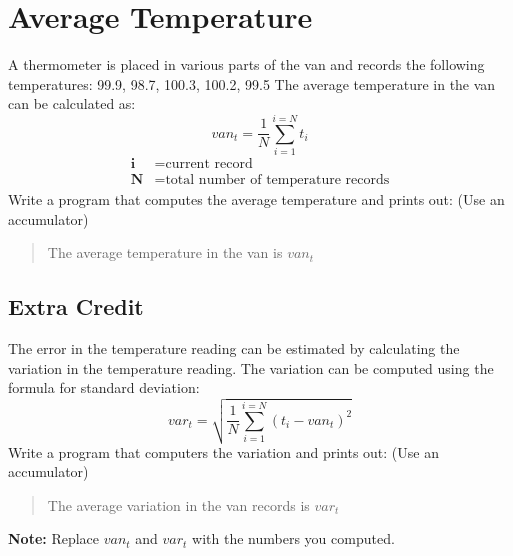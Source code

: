 \documentclass{article}
\begin{document}
\section*{Average Temperature}
A thermometer is placed in various parts of the van and records the following temperatures: 99.9, 98.7, 100.3, 100.2, 99.5 
The average temperature in the van can be calculated as:
\begin{equation}
	van_{t} = \frac{1}{N}\sum_{i=1}^{i=N}t_{i}
\end{equation}
\begin{align*}
	\textbf{i} &= \text{current record}\\
	\textbf{N} &=  \text{total number of temperature records}
\end{align*}
Write a program that computes the average temperature and prints out: (Use an accumulator)
\begin{quote}
	The average temperature in the van is \textit{$van_{t}$}
\end{quote}

\subsection*{Extra Credit}
The error in the temperature reading can be estimated by calculating the variation in the temperature reading. The variation can be computed using the formula for standard deviation:
\begin{equation}
	var_{t} = \sqrt{\frac{1}{N}\sum_{i=1}^{i=N}(t_{i} - van_{t})^{2}}
\end{equation}
Write a program that computers the variation and prints out: (Use an accumulator)
\begin{quote}
	The average variation in the van records is \textit{$var_{t}$}
\end{quote}
\textbf{Note:} Replace $van_{t}$ and $var_{t}$ with the numbers you computed. 
\end{document}
